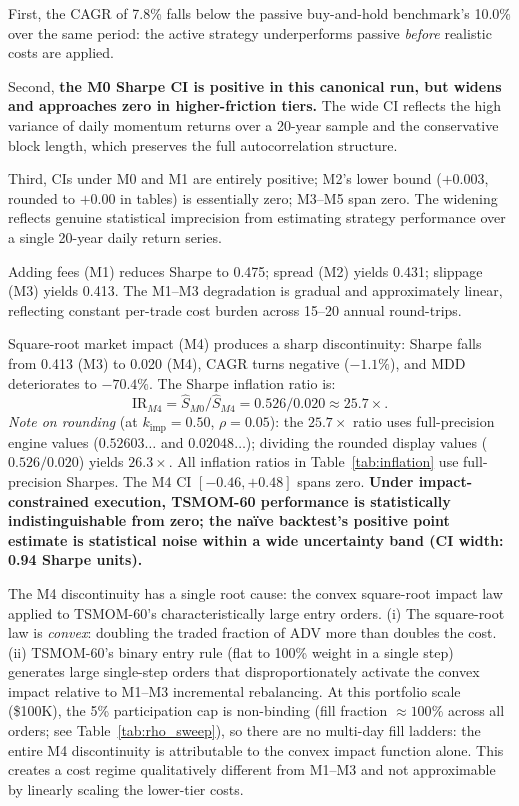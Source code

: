 \documentclass[12pt]{article}
\newcommand{\finding}[1]{\textbf{#1}}
\newcommand{\kimp}{k_{\mathrm{imp}}}
\begin{document}
First, the CAGR of 7.8\% falls below the passive buy-and-hold
benchmark's 10.0\% over the same period: the active strategy
underperforms passive \emph{before} realistic costs are applied.

Second, \finding{the M0 Sharpe CI is positive in this canonical run, but
widens and approaches zero in higher-friction tiers.} The wide CI reflects the high variance of daily
momentum returns over a 20-year sample and the conservative block
length, which preserves the full autocorrelation structure.

Third, CIs under M0 and M1 are entirely positive; M2's lower bound
($+0.003$, rounded to $+0.00$ in tables) is essentially zero; M3--M5
span zero. The widening reflects genuine statistical imprecision from
estimating strategy performance over a single 20-year daily return series.

Adding fees (M1) reduces Sharpe to 0.475; spread (M2) yields 0.431;
slippage (M3) yields 0.413. The M1--M3 degradation is gradual and
approximately linear, reflecting constant per-trade cost burden across
15--20 annual round-trips.

Square-root market impact (M4) produces a sharp
discontinuity: Sharpe falls from 0.413 (M3) to 0.020 (M4), CAGR
turns negative ($-1.1\%$), and MDD deteriorates to $-70.4\%$.
The Sharpe inflation ratio is:
\begin{equation}
  \mathrm{IR}_{M4} = \hat{S}_{M0}/\hat{S}_{M4} = 0.526/0.020
  \approx 25.7\times.
\end{equation}
\noindent\textit{Note on rounding} (at $\kimp=0.50$, $\rho=0.05$): the $25.7\times$ ratio uses
full-precision engine values ($0.52603\ldots$ and $0.02048\ldots$);
dividing the rounded display values ($0.526/0.020$) yields $26.3\times$.
All inflation ratios in Table~\ref{tab:inflation} use full-precision Sharpes.
The M4 CI $[-0.46, +0.48]$ spans zero.
\finding{Under impact-constrained execution, TSMOM-60 performance is
statistically indistinguishable from zero; the na\"{i}ve backtest's
positive point estimate is statistical noise within a wide
uncertainty band (CI width: 0.94 Sharpe units).}

The M4 discontinuity has a single root cause: the convex square-root
impact law applied to TSMOM-60's characteristically large entry
orders. (i) The square-root law is \emph{convex}: doubling the traded
fraction of ADV more than doubles the cost. (ii) TSMOM-60's binary
entry rule (flat to 100\% weight in a single step) generates large
single-step orders that disproportionately activate the convex impact
relative to M1--M3 incremental rebalancing. At this portfolio scale
(\$100K), the 5\% participation cap is non-binding (fill fraction
$\approx 100\%$ across all orders; see Table~\ref{tab:rho_sweep}),
so there are no multi-day fill ladders: the entire M4 discontinuity
is attributable to the convex impact function alone. This creates a
cost regime qualitatively different from M1--M3 and not approximable
by linearly scaling the lower-tier costs.
\end{document}
